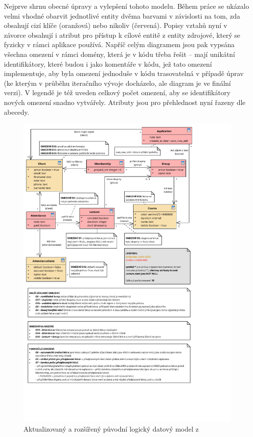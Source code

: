 Nejprve shrnu obecné úpravy a vylepšení tohoto modelu. Během práce se ukázalo velmi vhodné obarvit jednotlivé entity dvěma barvami v závislosti na tom, zda obsahují cizí klíče (oranžová) nebo nikoliv (červená). Popisy vztahů nyní v závorce obsahují i atribut pro přístup k cílové entitě z entity zdrojové, který se fyzicky v rámci aplikace používá. Napříč celým diagramem jsou pak vypsána všechna omezení v rámci domény, která je v kódu třeba řešit -- mají unikátní identifikátory, které budou i jako komentáře v kódu, jež tato omezení implementuje, aby byla omezení jednoduše v kódu trasovatelná v případě úprav (ke kterým v průběhu iteračního vývoje docházelo, ale diagram je ve finální verzi). V legendě je též uveden celkový počet omezení, aby se identifikátory nových omezení snadno vytvářely. Atributy jsou pro přehlednost nyní řazeny dle abecedy.

\begin{figure}\centering
	\includegraphics[width=1\textwidth]{img/db-model}
	\caption[Aktualizovaný a rozšířený původní logický datový model]{Aktualizovaný a rozšířený původní logický datový model z~\cite{bp}}\label{fig:db-model}
\vspace{-28pt}
\end{figure}

